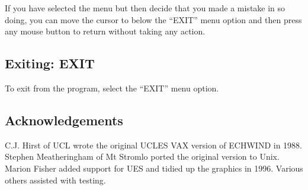\documentclass[11pt,nolof,noabs]{starlink}
\begin{document}
If you have selected the menu but then decide that you made a mistake in so
doing, you can move the cursor to below the ``EXIT'' menu option and then
press any mouse button to return without taking any action.

\subsection{Exiting: EXIT}

To exit from the program, select the ``EXIT'' menu option.

\subsection{Acknowledgements}

C.J. Hirst of UCL wrote the original UCLES VAX version of ECHWIND in 1988.
Stephen Meatheringham of Mt Stromlo ported the original version to Unix.
Marion Fisher added support for UES and tidied up the graphics in 1996.
Various others assisted with testing.
\end{document}
